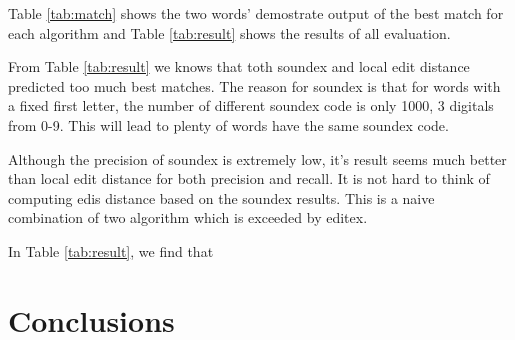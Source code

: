 \documentclass[11pt]{article}
\begin{document}
Table \ref{tab:match} shows the two words' demostrate output of the best match for each algorithm  and Table \ref{tab:result} shows the results of all evaluation.

From Table \ref{tab:result} we knows that toth soundex and local edit distance predicted too much best matches. The reason for soundex is that for words with a fixed first letter, the number of different soundex code is only 1000, 3 digitals from 0-9. This will lead to plenty of words have the same soundex code.

Although the precision of soundex is extremely low,  it's result seems much better than local edit distance for both precision and recall. It is not hard to think of computing edis distance based on the soundex results. This is a naive combination of two algorithm which is exceeded by editex. 

In Table \ref{tab:result}, we find that 


\section{Conclusions}




\end{document}
